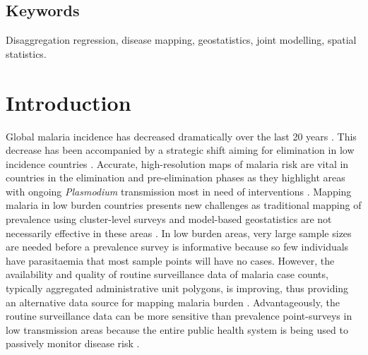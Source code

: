 \documentclass{statsoc}
\begin{document}
\subsection{Keywords}
Disaggregation regression, disease mapping, geostatistics, joint modelling, spatial statistics.


\section*{Introduction}



Global malaria incidence has decreased dramatically over the last 20 years \citep{bhatt2015effect, weiss2019mapping, battle2019mapping}.
This decrease has been accompanied by a strategic shift aiming for elimination in low incidence countries \citep{world2016world, newby2016path}.
Accurate, high-resolution maps of malaria risk are vital in countries in the elimination and pre-elimination phases as they highlight areas with ongoing \emph{Plasmodium} transmission most in need of interventions \citep{sturrock2016mapping, cohen2017mapping}.
Mapping malaria in low burden countries presents new challenges as traditional mapping of prevalence \citep{gething2011new, bhatt2017improved, gething2012long, bhatt2015effect} using cluster-level surveys and model-based geostatistics are not necessarily effective in these areas \citep{sturrock2016mapping, sturrock2014fine}.
In low burden areas, very large sample sizes are needed before a prevalence survey is informative because so few individuals have parasitaemia that most sample points will have no cases.
However, the availability and quality of routine surveillance data of malaria case counts, typically aggregated administrative unit polygons, is improving, thus providing an alternative data source for mapping malaria burden \citep{sturrock2016mapping, ohrt2015information, cibulskis2011worldwide}.
Advantageously, the routine surveillance data can be more sensitive than prevalence point-surveys in low transmission areas because the entire public health system is being used to passively monitor disease risk \citep{cibulskis2011worldwide}.
\end{document}
